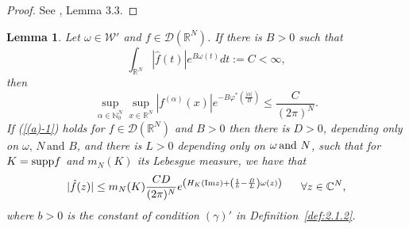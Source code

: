 \documentclass[twoside]{amsart}
\newtheorem{Lemma}[Th]{Lemma}
\begin{document}
\begin{proof}
See \cite{BMT}, Lemma 3.3.
\end{proof}

\begin{Lemma}
\label{3.3 B}
Let $\omega\in{\mathcal{W}}'$ and $f\in{\mathcal{D}}(\mathbb{R}^{N})$.
If there is $B>0$ such that
\[
{\displaystyle \int_{\mathbb{R}^{N}}|\hat{f}(t)|e^{B\omega(t)}dt:=C<\infty},
\]
then
\begin{equation}
\underset{\alpha\in\mathbb{N}_{0}^{N}}{\sup}
\underset{x\in\mathbb{R}^{N}}{\sup}|f^{(\alpha)}(x)|
e^{-B\varphi^{*}\left(\frac{|\alpha|}{B}\right)}\leq
\frac{C}{(2\pi)^{N}}.
\label{(a)-1}
\end{equation}
If (\ref{(a)-1}) holds for $f\in{\mathcal{D}}({\mathbb R}^N)$ and $B>0$ then there
is $D>0$, depending only on $\omega,\,N\,\mbox{and}\,\,B$, and there
is $L>0$ depending only on $\omega\,\mbox{and\,}\,N$, such that
for $K={\mathop{\rm supp}\nolimits} f$ and $m_{N}(K)$ its Lebesgue measure, we have that
\begin{equation}
|\hat{f}(z)|\leq m_{N}(K){\displaystyle \frac{CD}{(2\pi)^{N}}
e^{\left(H_{K}({\mathop{\rm Im}\nolimits} z)+\left(\frac{1}{b}-\frac{B}{L}\right)\omega(z)\right)}
\,\,\,\,\,\,\,\,\,\,\forall z\in\mathbb{C}^{N},}
\label{(b')}
\end{equation}
where $b>0$ is the constant of condition $(\gamma)'$ in
Definition~\ref{def:2.1.2}.
\end{Lemma}
\end{document}
